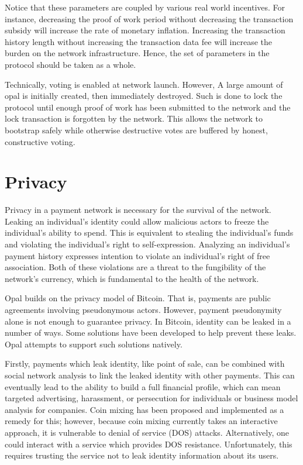 \documentclass[10pt,twocolumn]{article}
\begin{document}
Notice that these parameters are coupled by various real world incentives.  For instance, decreasing the proof of work period without decreasing the transaction subsidy will increase the rate of monetary inflation.  Increasing the transaction history length without increasing the transaction data fee will increase the burden on the network infrastructure.  Hence, the set of parameters in the protocol should be taken as a whole.

Technically, voting is enabled at network launch.  However, A large amount of opal is initially created, then immediately destroyed.  Such is done to lock the protocol until enough proof of work has been submitted to the network and the lock transaction is forgotten by the network.  This allows the network to bootstrap safely while otherwise destructive votes are buffered by honest, constructive voting. 

\section{Privacy}
Privacy in a payment network is necessary for the survival of the network.  Leaking an individual's identity could allow malicious actors to freeze the individual’s ability to spend.  This is equivalent to stealing the individual's funds and violating the individual's right to self-expression.  Analyzing an individual's payment history expresses intention to violate an individual's right of free association.  Both of these violations are a threat to the fungibility of the network's currency, which is fundamental to the health of the network.

Opal builds on the privacy model of Bitcoin.  That is, payments are public agreements involving pseudonymous actors.  However, payment pseudonymity alone is not enough to guarantee privacy.  In Bitcoin, identity can be leaked in a number of ways.  Some solutions have been developed to help prevent these leaks.  Opal attempts to support such solutions natively.

Firstly, payments which leak identity, like point of sale, can be combined with social network analysis to link the leaked identity with other payments.  This can eventually lead to the ability to build a full financial profile, which can mean targeted advertising, harassment, or persecution for individuals or business model analysis for companies.  Coin mixing has been proposed and implemented as a remedy for this; however, because coin mixing currently takes an interactive approach, it is vulnerable to denial of service (DOS) attacks.  Alternatively, one could interact with a service which provides DOS resistance.  Unfortunately, this requires trusting the service not to leak identity information about its users.
\end{document}
